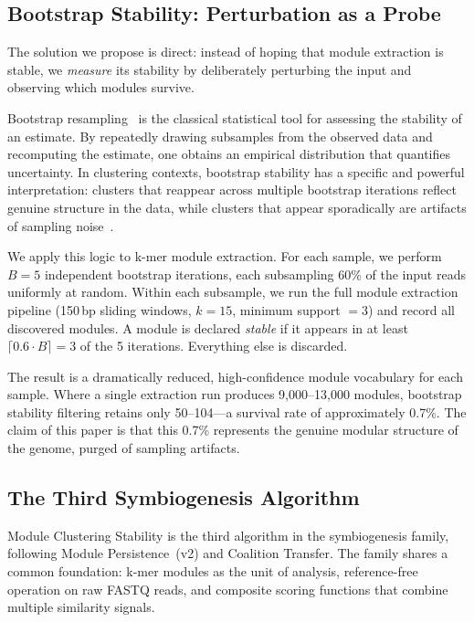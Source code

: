 \documentclass{../yalumba}
\begin{document}
\subsection{Bootstrap Stability: Perturbation as a Probe}

The solution we propose is direct: instead of hoping that module extraction is
stable, we \emph{measure} its stability by deliberately perturbing the input and
observing which modules survive.


Bootstrap resampling~\cite{efron1979bootstrap} is the classical statistical
tool for assessing the stability of an estimate.  By repeatedly drawing
subsamples from the observed data and recomputing the estimate, one obtains an
empirical distribution that quantifies uncertainty.  In clustering contexts,
bootstrap stability has a specific and powerful interpretation: clusters that
reappear across multiple bootstrap iterations reflect genuine structure in the
data, while clusters that appear sporadically are artifacts of sampling
noise~\cite{hennig2007cluster, fang2012selection}.

We apply this logic to k-mer module extraction.  For each sample, we perform
$B = 5$ independent bootstrap iterations, each subsampling 60\% of the input
reads uniformly at random.  Within each subsample, we run the full module
extraction pipeline (150\,bp sliding windows, $k = 15$, minimum support $= 3$)
and record all discovered modules.  A module is declared \emph{stable} if it
appears in at least $\lceil 0.6 \cdot B \rceil = 3$ of the 5 iterations.
Everything else is discarded.

The result is a dramatically reduced, high-confidence module vocabulary for
each sample.  Where a single extraction run produces 9{,}000--13{,}000 modules,
bootstrap stability filtering retains only 50--104---a survival rate of
approximately 0.7\%.  The claim of this paper is that this 0.7\% represents the
genuine modular structure of the genome, purged of sampling artifacts.

\subsection{The Third Symbiogenesis Algorithm}

Module Clustering Stability is the third algorithm in the symbiogenesis family,
following Module Persistence~(v2) and Coalition Transfer.  The family shares a
common foundation: k-mer modules as the unit of analysis, reference-free
operation on raw FASTQ reads, and composite scoring functions that combine
multiple similarity signals.
\end{document}

